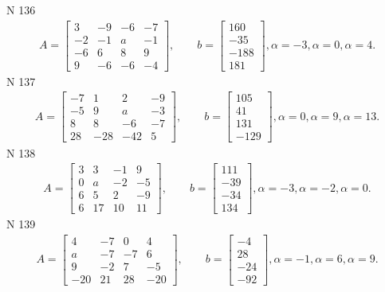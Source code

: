\documentclass[11pt]{report}
\begin{document}
N 136
\begin{align*}
 A = \left[\begin{matrix}3 & -9 & -6 & -7\\-2 & -1 & a & -1\\-6 & 6 & 8 & 9\\9 & -6 & -6 & -4\end{matrix}\right],
    \qquad b = \left[\begin{matrix}160\\-35\\-188\\181\end{matrix}\right], \alpha = -3, \alpha = 0, \alpha = 4. 
 \end{align*}
N 137
\begin{align*}
 A = \left[\begin{matrix}-7 & 1 & 2 & -9\\-5 & 9 & a & -3\\8 & 8 & -6 & -7\\28 & -28 & -42 & 5\end{matrix}\right],
    \qquad b = \left[\begin{matrix}105\\41\\131\\-129\end{matrix}\right], \alpha = 0, \alpha = 9, \alpha = 13. 
 \end{align*}
N 138
\begin{align*}
 A = \left[\begin{matrix}3 & 3 & -1 & 9\\0 & a & -2 & -5\\6 & 5 & 2 & -9\\6 & 17 & 10 & 11\end{matrix}\right],
    \qquad b = \left[\begin{matrix}111\\-39\\-34\\134\end{matrix}\right], \alpha = -3, \alpha = -2, \alpha = 0. 
 \end{align*}
N 139
\begin{align*}
 A = \left[\begin{matrix}4 & -7 & 0 & 4\\a & -7 & -7 & 6\\9 & -2 & 7 & -5\\-20 & 21 & 28 & -20\end{matrix}\right],
    \qquad b = \left[\begin{matrix}-4\\28\\-24\\-92\end{matrix}\right], \alpha = -1, \alpha = 6, \alpha = 9. 
 \end{align*}
\end{document}
